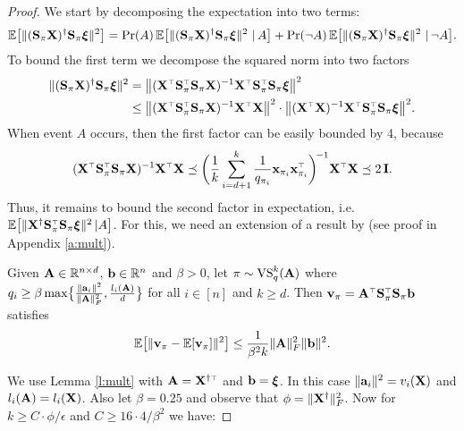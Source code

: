 \documentclass[12pt]{sty/colt2019/colt2018-arxiv}
\begin{document}
\begin{proof}
We start by decomposing the expectation
into two terms: 
    \begin{align}
      \mathbb E\big[\|(\mathbf{S}_\pi\mathbf X)^\dagger\mathbf{S}_\pi\boldsymbol\xi\|^2\big] =
      \mathrm{Pr}(A)\,\mathbb E\big[\|(\mathbf{S}_\pi\mathbf X)^\dagger\mathbf{S}_\pi\boldsymbol\xi\|^2\ |\,A\big] + \mathrm{Pr}(\neg
      A)\,\mathbb E\big[\|(\mathbf{S}_\pi\mathbf X)^\dagger\mathbf{S}_\pi\boldsymbol\xi\|^2\ |\,\neg A\big].\label{eq:terms}
    \end{align}
To bound the first term we decompose the squared norm into
two factors 
    \begin{align*}
\|(\S_\pi\X)^\dagger\S_\pi\xib\|^2
      &= \big\|(\X^\top\S_\pi^\top\S_\pi\X)^{-1}
        \X^\top\S_\pi^\top\S_\pi\xib\big\|^2
    \\ & \leq \big\|(\X^\top\S_\pi^\top\S_\pi\X)^{-1}\X^\top\X\big\|^2
        \cdot\big\|(\X^\top\X)^{-1}\X^\top\S_\pi^\top\S_\pi\xib\big\|^2.
    \end{align*}
   When event $A$ occurs, then the first factor can be easily bounded by 4, because
   \begin{align*}
(\X^\top\S_\pi^\top\S_\pi\X)^{-1}\X^\top\X\preceq
     \bigg(\frac1k\sum_{i=d+1}^k\frac1{q_{\pi_i}}\x_{\pi_i}\x_{\pi_i}^\top\bigg)^{\!-1}\X^\top\X\preceq 2\,\I.
   \end{align*}
Thus, it remains to bound the second factor in expectation,
i.e.
$\E\big[\|\X^\dagger\S_\pi^\top\S_\pi\xib\|^2\,|A\big]$. For this,
we 
   need an extension of a result by \cite{leveraged-volume-sampling}
(see proof in Appendix \ref{a:mult}).
   \begin{lemma}\label{l:mult}
  Given $\mathbf A\in\mathbb R^{n\times d}$,
  $\mathbf b\in\mathbb R^n$ and $\beta>0$, let $\pi\sim{\mathrm{VS}}_q^k(\mathbf A)$ where $q_i\geq 
  \beta\max\!\big\{\frac{\|\mathbf a_i\|^2}{\|\mathbf A\|_F^2},\frac{l_i(\mathbf A)}{d}\big\}$
  for all $i\in [n]$ and $k\geq d$. Then
  $\v_\pi=\A^\top\S_\pi^\top\S_\pi\b$ satisfies 
  \begin{align*}
\mathbb E\big[\|\mathbf v_\pi-\mathbb E[\mathbf v_\pi]\|^2\big]\leq
    \frac1{\beta^2 k}\|\mathbf A\|_F^2\|\mathbf b\|^2.
  \end{align*}
\end{lemma}
We use Lemma \ref{l:mult} with %
$\A=\X^{\dagger\top}$ and $\mathbf b=\boldsymbol\xi$. In this case
$\|\mathbf a_i\|^2=v_i(\mathbf X)$ and $l_i(\mathbf A)=l_i(\mathbf X)$. Also let
$\beta=0.25$ and observe that $\phi=\|\mathbf X^\dagger\|_F^2$.
Now for $k\ge C\cdot\phi/\epsilon$ and $C\geq 16\cdot4/\beta^2$ we have:

\end{proof}
\end{document}
